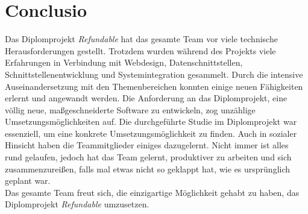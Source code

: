 \chapter{Conclusio}
Das Diplomprojekt \textit{Refundable} hat das gesamte Team vor viele technische Herausforderungen gestellt. Trotzdem wurden während des Projekts viele Erfahrungen in Verbindung mit Webdesign, Datenschnittstellen, Schnittstellenentwicklung und Systemintegration gesammelt. Durch die intensive Auseinandersetzung mit den Themenbereichen konnten einige neuen Fähigkeiten erlernt und angewandt werden. Die Anforderung an das Diplomprojekt, eine völlig neue, maßgeschneiderte Software zu entwickeln, zog unzählige Umsetzungsmöglichkeiten auf. Die durchgeführte Studie im Diplomprojekt war essenziell, um eine konkrete Umsetzungsmöglichkeit zu finden. Auch in sozialer Hinsicht haben die Teammitglieder einiges dazugelernt. Nicht immer ist alles rund gelaufen, jedoch hat das Team gelernt, produktiver zu arbeiten und sich zusammenzureißen, falls mal etwas nicht so geklappt hat, wie es ursprünglich geplant war.\\Das gesamte Team freut sich, die einzigartige Möglichkeit gehabt zu haben, das Diplomprojekt \textit{Refundable} umzusetzen.